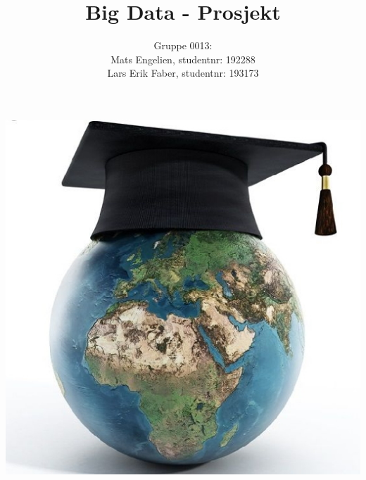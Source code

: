 \documentclass[12pt]{article}
\begin{document}
\title{Big Data - Prosjekt}
\author{%
    Gruppe 0013:\\
    Mats Engelien, studentnr: 192288\\
    Lars Erik Faber, studentnr: 193173}
\date{}
\maketitle
\begin{center}
    \includegraphics[scale=1]{images/world_education.jpg}    
\end{center}
\thispagestyle{empty}
\newpage
\tableofcontents
\thispagestyle{empty}
\newpage
\setcounter{page}{1}



\newpage

\newpage

\newpage

\newpage

\newpage

\newpage

\newpage

\newpage

\end{document}
